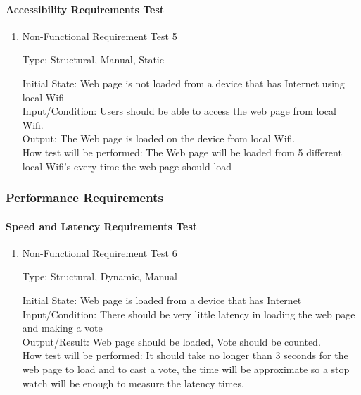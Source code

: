 \documentclass[12pt, titlepage]{article}
\begin{document}
\paragraph{Accessibility Requirements Test}

\begin{enumerate}

\item{Non-Functional Requirement Test 5\\}

Type: Structural, Manual, Static
					
Initial State: Web page is not loaded from a device that has Internet using local Wifi \\
					
Input/Condition: Users should be able to access the web page from local Wifi. \\
					
Output: The Web page is loaded on the device from local Wifi. \\
					
How test will be performed: The Web page will be loaded from 5 different local Wifi's every time the web page should load   \\

\end{enumerate}

\subsubsection{Performance Requirements}

\paragraph{Speed and Latency Requirements Test}

\begin{enumerate}

\item{ Non-Functional Requirement Test 6\\}

Type: Structural, Dynamic, Manual
					
Initial State: Web page is loaded from a device that has Internet \\
					
Input/Condition: There should be very little latency in loading the web page and making a vote \\
					
Output/Result: Web page should be loaded, Vote should be counted. \\
					
How test will be performed: It should take no longer than 3 seconds for the web page to load and to cast a vote, the time will be approximate so a stop watch will be enough to measure the latency times. \\
\end{enumerate}
\end{document}
